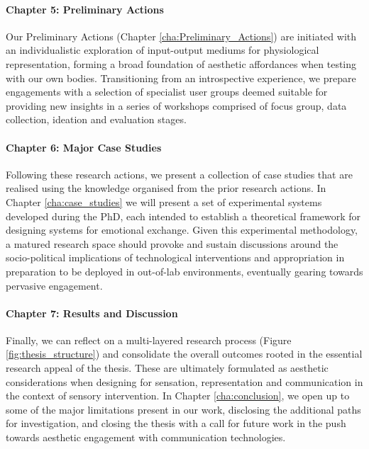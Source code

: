\paragraph{Chapter 5: Preliminary Actions}

Our Preliminary Actions (Chapter \ref{cha:Preliminary_Actions}) are initiated with an individualistic exploration of input-output mediums for physiological representation, forming a broad foundation of aesthetic affordances when testing with our own bodies. Transitioning from an introspective experience, we prepare engagements with a selection of specialist user groups deemed suitable for providing new insights in a series of workshops comprised of focus group, data collection, ideation and evaluation stages.

\paragraph{Chapter 6: Major Case Studies}

Following these research actions, we present a collection of case studies that are realised using the knowledge organised from the prior research actions. In Chapter \ref{cha:case_studies} we will present a set of experimental systems developed during the PhD, each intended to establish a theoretical framework for designing systems for emotional exchange. Given this experimental methodology, a matured research space should provoke and sustain discussions around the socio-political implications of technological interventions and appropriation in preparation to be deployed in out-of-lab environments, eventually gearing towards pervasive engagement.

\paragraph{Chapter 7: Results and Discussion}

Finally, we can reflect on a multi-layered research process (Figure \ref{fig:thesis_structure}) and consolidate the overall outcomes rooted in the essential research appeal of the thesis. These are ultimately formulated as aesthetic considerations when designing for sensation, representation and communication in the context of sensory intervention. In Chapter \ref{cha:conclusion}, we open up to some of the major limitations present in our work, disclosing the additional paths for investigation, and closing the thesis with a call for future work in the push towards aesthetic engagement with communication technologies.


